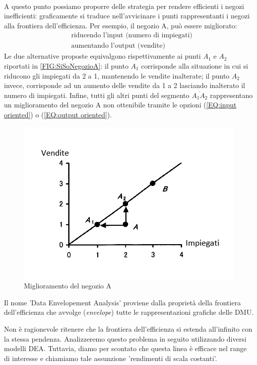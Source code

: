 \paragraph{} A questo punto possiamo proporre delle strategia per rendere efficienti i negozi inefficienti: graficamente si traduce nell'avvicinare i punti rappresentanti i negozi alla frontiera dell'efficienza. Per esempio, il negozio A, pu\`o essere migliorato:
\begin{align}
&\text{riducendo l'input (numero di impiegati)}\label{EQ:input oriented}\\
&\text{aumentando l'output (vendite)}\label{EQ:output oriented}
\end{align}
Le due alternative proposte equivalgono rispettivamente ai punti $A_1$ e $A_2$ riportati in \autoref{FIG:SiSoNegozioA}: il punto $A_1$ corrisponde alla situazione in cui si riducono gli impiegati da 2 a 1, mantenendo le vendite inalterate; il punto $A_2$ invece, corrisponde ad un aumento delle vendite da 1 a 2 lasciando inalterato il numero di impiegati. Infine, tutti gli altri punti del segmento $\overline{A_1A_2}$ rappresentano un miglioramento del negozio A non ottenibile tramite le opzioni (\ref{EQ:input oriented}) o (\ref{EQ:output oriented}).

\begin{figure}[H]
\centering
\includegraphics[scale=1]{Img/GraficoSiSoNegozioA.png}
\caption{Miglioramento del negozio A}\label{FIG:SiSoNegozioA}
\end{figure}

\begin{oss}
Il nome 'Data Envelopement Analysis' proviene dalla propriet\`a della frontiera dell'efficienza che avvolge (\emph{envelope}) tutte le rappresentazioni grafiche delle DMU.
\end{oss}
Non è ragionevole ritenere che la frontiera dell'efficienza si estenda all'infinito con la stessa pendenza. Analizzeremo questo problema in seguito utilizzando diversi modelli DEA. Tuttavia, diamo per scontato che questa linea è efficace nel range di interesse e chiamiamo tale assunzione 'rendimenti di scala costanti'.
